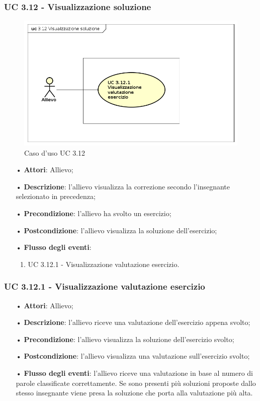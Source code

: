 \subsubsection{UC 3.12 - Visualizzazione soluzione}
\begin{figure}[H]
	\centering
	\includegraphics[width=17cm]{img/UC312.png} 
	\caption{Caso d'uso UC 3.12}\label{fig:312}
\end{figure}
\begin{itemize}
	\item[•]\textbf{Attori}: Allievo;
	\item[•]\textbf{Descrizione}: l'allievo visualizza la correzione secondo l'insegnante selezionato in precedenza;
	\item[•]\textbf{Precondizione}: l'allievo ha svolto un esercizio;
	\item[•]\textbf{Postcondizione}: l'allievo visualizza la soluzione dell'esercizio;
	\item[•]\textbf{Flusso degli eventi}:
	\begin{enumerate}
		\item UC 3.12.1 - Visualizzazione valutazione esercizio.  
	\end{enumerate}
\end{itemize}


\subsubsection{UC 3.12.1 - Visualizzazione valutazione esercizio}   

\begin{itemize}
\item[•]\textbf{Attori}: Allievo;
\item[•]\textbf{Descrizione}: l'allievo riceve una valutazione dell'esercizio appena svolto;
\item[•]\textbf{Precondizione}: l'allievo visualizza la soluzione dell'esercizio svolto;
\item[•]\textbf{Postcondizione}: l'allievo visualizza una valutazione sull'esercizio svolto;
\item[•]\textbf{Flusso degli eventi}:  l'allievo riceve una valutazione in base al numero di parole classificate correttamente. Se sono presenti più soluzioni proposte dallo stesso insegnante viene presa la soluzione che porta alla valutazione più alta.
\end{itemize}

